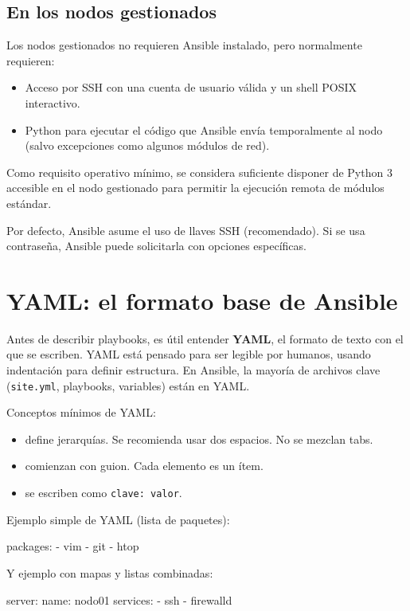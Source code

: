 \subsection{En los nodos gestionados}
Los nodos gestionados no requieren Ansible instalado, pero normalmente requieren:
\begin{itemize}
  \item Acceso por SSH con una cuenta de usuario válida y un shell POSIX interactivo.
  \item Python para ejecutar el código que Ansible envía temporalmente al nodo (salvo excepciones como algunos módulos de red). \cite{ansible_installation_guide}
\end{itemize}

Como requisito operativo mínimo, se considera suficiente disponer de Python 3 accesible en el nodo gestionado para permitir la ejecución remota de módulos estándar.

Por defecto, Ansible asume el uso de llaves SSH (recomendado). Si se usa contraseña, Ansible puede solicitarla con opciones específicas. \cite{ansible_connection_details}

\section{YAML: el formato base de Ansible}
\label{sec:ansible_yaml}

Antes de describir playbooks, es útil entender \textbf{YAML}, el formato de texto con el que se escriben. YAML está pensado para ser legible por humanos, usando indentación para definir estructura. En Ansible, la mayoría de archivos clave (\texttt{site.yml}, playbooks, variables) están en YAML.

Conceptos mínimos de YAML:
\begin{itemize}
  \item {} define jerarquías. Se recomienda usar dos espacios. No se mezclan tabs.
  \item {} comienzan con guion. Cada elemento es un ítem.
  \item {} se escriben como \texttt{clave: valor}.
\end{itemize}

Ejemplo simple de YAML (lista de paquetes):
\begin{yamlcode}
packages:
  - vim
  - git
  - htop
\end{yamlcode}

Y ejemplo con mapas y listas combinadas:
\begin{yamlcode}
server:
  name: nodo01
  services:
    - ssh
    - firewalld
\end{yamlcode}

